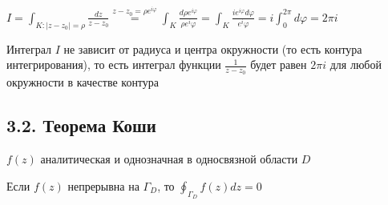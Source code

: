 \documentclass[12pt]{article}
\begin{document}
\Ex $I = \int_{K : |z - z_0| = \rho} \frac{dz}{z - z_0} \overset{z - z_0 = \rho e^{i\varphi}}{=} \int_K \frac{d\rho e^{i\varphi}}{\rho e^i\varphi} = 
\int_K \frac{i e^{i\varphi} d\varphi}{e^i\varphi} = i \int_0^{2\pi} d\varphi = 2\pi i$

Интеграл $I$ не зависит от радиуса и центра окружности (то есть контура интегрирования), то есть
интеграл функции $\frac{1}{z - z_0}$ будет равен $2\pi i$ для любой окружности в качестве контура 

\subsection{3.2. Теорема Коши}

\begin{MyTheorem}
     $f(z)$ аналитическая и однозначная в односвязной области $D$

    Если $f(z)$ непрерывна на $\Gamma_D$, то $\oint_{\Gamma_D} f(z) dz = 0$
\end{MyTheorem}
\end{document}
